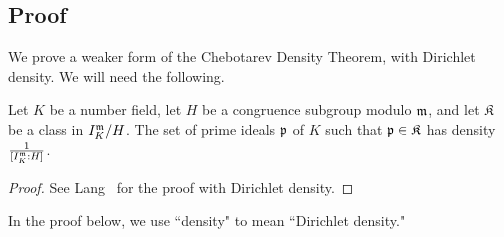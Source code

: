 \subsection{Proof}
We prove a weaker form of the Chebotarev Density Theorem, with Dirichlet density. %
We will need the following.
\begin{thm}
Let $K$ be a number field, let $H$ be a congruence subgroup modulo $\mathfrak{m}$, and let $\mathfrak K$ be a class in $I_K^{\mathfrak{m}}/H$. The set of prime ideals $\mathfrak{p}$ of $K$ such that $\mathfrak{p}\in \mathfrak K$ has density $\frac{1}{[I_K^{\mathfrak{m}}:H]}$.
\end{thm}
\begin{proof}
See Lang~\cite[VIII. \S4]{La94} for the proof with Dirichlet density.
\end{proof}
In the proof below, we use ``density" to mean ``Dirichlet density."
